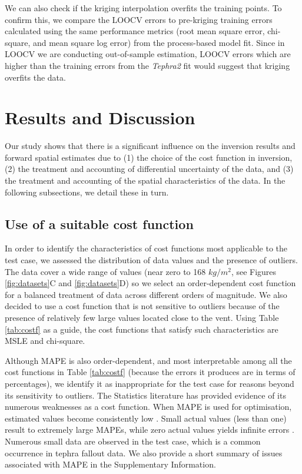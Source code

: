 \documentclass[a4paper,fleqn]{cas-sc}
\begin{document}
    We can also check if the kriging interpolation overfits the training points. To confirm this, we compare the LOOCV errors to pre-kriging training errors calculated using the same performance metrics (root mean square error, chi-square, and mean square log error) from the process-based model fit. Since in LOOCV we are conducting out-of-sample estimation, LOOCV errors which are higher than the training errors from the \textit{Tephra2} fit would suggest that kriging overfits the data.
  


\section{Results and Discussion}\label{section-results} %

Our study shows that there is a significant influence on the inversion results and forward spatial estimates due to (1) the choice of the cost function in inversion, (2) the treatment and accounting of differential uncertainty of the data, and (3) the treatment and accounting of the spatial characteristics of the data. In the following subsections, we detail these in turn.

\subsection{Use of a suitable cost function} \label{subsection-res-costf}

In order to identify the characteristics of cost functions most applicable to the test case, we assessed the distribution of data values and the presence of outliers. The data cover a wide range of values (near zero to 168 $kg/m^{2}$, see Figures \ref{fig:datasets}C and \ref{fig:datasets}D) so we select an order-dependent cost function for a balanced treatment of data across different orders of magnitude. We also decided to use a cost function that is not sensitive to outliers because of the presence of relatively few large values located close to the vent. Using Table \ref{tab:costf} as a guide, the cost functions that satisfy such characteristics are MSLE and chi-square.

Although MAPE is also order-dependent, and most interpretable among all the cost functions in Table \ref{tab:costf} (because the errors it produces are in terms of percentages), we identify it as inappropriate for the test case for reasons beyond its sensitivity to outliers. The Statistics literature has provided evidence of its numerous weaknesses as a cost function. When MAPE is used for optimisation, estimated values become consistently low \citep{tofallis2015better}. Small actual values (less than one) result to extremely large MAPEs, while zero actual values yields infinite errors \citep{kim2016new}. Numerous small data are observed in the test case, which is a common occurrence in tephra fallout data. We also provide a short summary of issues associated with MAPE in the Supplementary Information.
\end{document}
